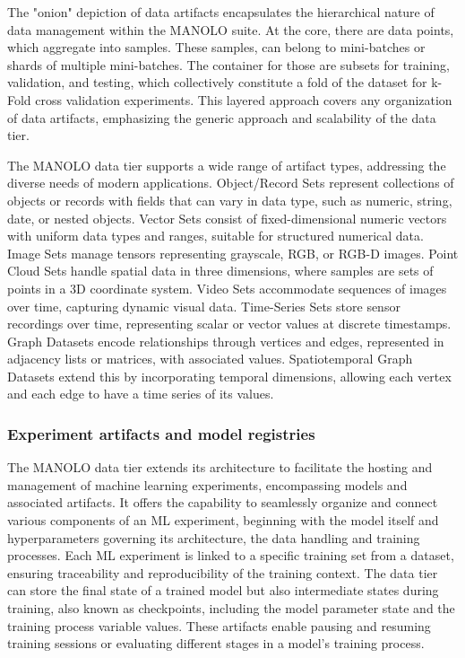 The "onion" depiction of data artifacts encapsulates the hierarchical nature of data management within the MANOLO suite. At the core, there are data points, which aggregate into samples. These samples, can belong to mini-batches or shards of multiple mini-batches. The container for those are subsets for training, validation, and testing, which collectively constitute a fold of the dataset for k-Fold cross validation experiments. This layered approach covers any organization of data artifacts, emphasizing the generic approach and scalability of the data tier.

The MANOLO data tier supports a wide range of artifact types, addressing the diverse needs of modern applications. Object/Record Sets represent collections of objects or records with fields that can vary in data type, such as numeric, string, date, or nested objects. Vector Sets consist of fixed-dimensional numeric vectors with uniform data types and ranges, suitable for structured numerical data. Image Sets manage tensors representing grayscale, RGB, or RGB-D images. Point Cloud Sets handle spatial data in three dimensions, where samples are sets of points in a 3D coordinate system. Video Sets accommodate sequences of images over time, capturing dynamic visual data. Time-Series Sets store sensor recordings over time, representing scalar or vector values at discrete timestamps. Graph Datasets encode relationships through vertices and edges, represented in adjacency lists or matrices, with associated values. Spatiotemporal Graph Datasets extend this by incorporating temporal dimensions, allowing each vertex and each edge to have a time series of its values. 

\subsubsection{Experiment artifacts and model registries}
The MANOLO data tier extends its architecture to facilitate the hosting and management of machine learning experiments, encompassing models and associated artifacts. It offers the capability to seamlessly organize and connect various components of an ML experiment, beginning with the model itself and hyperparameters governing its architecture, the data handling and training processes. Each ML experiment is linked to a specific training set from a dataset, ensuring traceability and reproducibility of the training context. The data tier can store the final state of a trained model but also intermediate states during training, also known as checkpoints, including the model parameter state and the training process variable values. These artifacts enable pausing and resuming training sessions or evaluating different stages in a model's training process.

